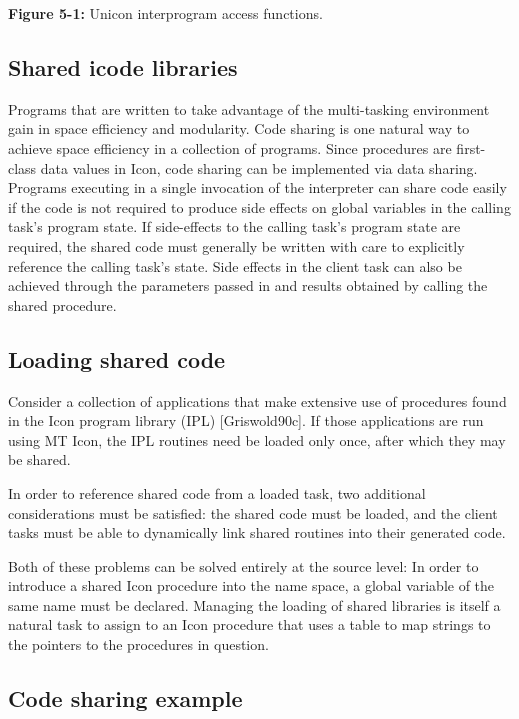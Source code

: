 {\sffamily\bfseries Figure 5-1:}
{\sffamily Unicon interprogram access functions.}



\subsection*{Shared icode libraries}

Programs that are written to take advantage of the multi-tasking environment
gain in space efficiency and modularity. Code sharing is one natural way to
achieve space efficiency in a collection of programs. Since procedures are
first-class data values in Icon, code sharing can be implemented via data
sharing. Programs executing in a single invocation of the interpreter can share
code easily if the code is not required to produce side effects on global
variables in the calling task's program state. If side-effects to the calling
task's program state are required, the shared code must generally be written
with care to explicitly reference the calling task's state. Side effects in the
client task can also be achieved through the parameters passed in and results
obtained by calling the shared procedure.

\subsection*{Loading shared code}

Consider a collection of applications that make extensive use of
procedures found in the Icon program library (IPL) [Griswold90c]. If
those applications are run using MT Icon, the IPL routines need be
loaded only once, after which they may be shared.

In order to reference shared code from a loaded task, two additional
considerations must be satisfied: the shared code must be loaded, and
the client tasks must be able to dynamically link shared routines into
their generated code.

Both of these problems can be solved entirely at the source level: In
order to introduce a shared Icon procedure into the name space, a
global variable of the same name must be declared. Managing the
loading of shared libraries is itself a natural task to assign to an
Icon procedure that uses a table to map strings to the pointers to the
procedures in question.

\subsection*{Code sharing example}

